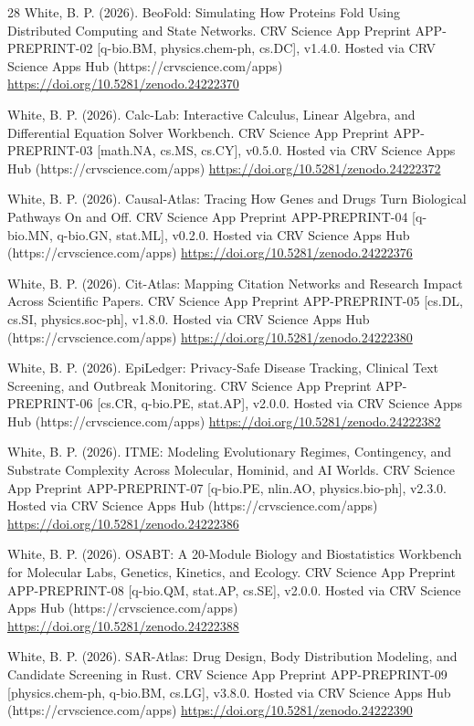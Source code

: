 \documentclass[10pt,letterpaper]{article}
\begin{document}
\begin{thebibliography}{28}
 White, B. P. (2026). BeoFold: Simulating How Proteins Fold Using Distributed Computing and State Networks. CRV Science App Preprint APP-PREPRINT-02 [q-bio.BM, physics.chem-ph, cs.DC], v1.4.0. Hosted via CRV Science Apps Hub (https://crvscience.com/apps) \url{https://doi.org/10.5281/zenodo.24222370}

 White, B. P. (2026). Calc-Lab: Interactive Calculus, Linear Algebra, and Differential Equation Solver Workbench. CRV Science App Preprint APP-PREPRINT-03 [math.NA, cs.MS, cs.CY], v0.5.0. Hosted via CRV Science Apps Hub (https://crvscience.com/apps) \url{https://doi.org/10.5281/zenodo.24222372}

 White, B. P. (2026). Causal-Atlas: Tracing How Genes and Drugs Turn Biological Pathways On and Off. CRV Science App Preprint APP-PREPRINT-04 [q-bio.MN, q-bio.GN, stat.ML], v0.2.0. Hosted via CRV Science Apps Hub (https://crvscience.com/apps) \url{https://doi.org/10.5281/zenodo.24222376}

 White, B. P. (2026). Cit-Atlas: Mapping Citation Networks and Research Impact Across Scientific Papers. CRV Science App Preprint APP-PREPRINT-05 [cs.DL, cs.SI, physics.soc-ph], v1.8.0. Hosted via CRV Science Apps Hub (https://crvscience.com/apps) \url{https://doi.org/10.5281/zenodo.24222380}

 White, B. P. (2026). EpiLedger: Privacy-Safe Disease Tracking, Clinical Text Screening, and Outbreak Monitoring. CRV Science App Preprint APP-PREPRINT-06 [cs.CR, q-bio.PE, stat.AP], v2.0.0. Hosted via CRV Science Apps Hub (https://crvscience.com/apps) \url{https://doi.org/10.5281/zenodo.24222382}

 White, B. P. (2026). ITME: Modeling Evolutionary Regimes, Contingency, and Substrate Complexity Across Molecular, Hominid, and AI Worlds. CRV Science App Preprint APP-PREPRINT-07 [q-bio.PE, nlin.AO, physics.bio-ph], v2.3.0. Hosted via CRV Science Apps Hub (https://crvscience.com/apps) \url{https://doi.org/10.5281/zenodo.24222386}

 White, B. P. (2026). OSABT: A 20-Module Biology and Biostatistics Workbench for Molecular Labs, Genetics, Kinetics, and Ecology. CRV Science App Preprint APP-PREPRINT-08 [q-bio.QM, stat.AP, cs.SE], v2.0.0. Hosted via CRV Science Apps Hub (https://crvscience.com/apps) \url{https://doi.org/10.5281/zenodo.24222388}

 White, B. P. (2026). SAR-Atlas: Drug Design, Body Distribution Modeling, and Candidate Screening in Rust. CRV Science App Preprint APP-PREPRINT-09 [physics.chem-ph, q-bio.BM, cs.LG], v3.8.0. Hosted via CRV Science Apps Hub (https://crvscience.com/apps) \url{https://doi.org/10.5281/zenodo.24222390}


\end{thebibliography}
\end{document}
